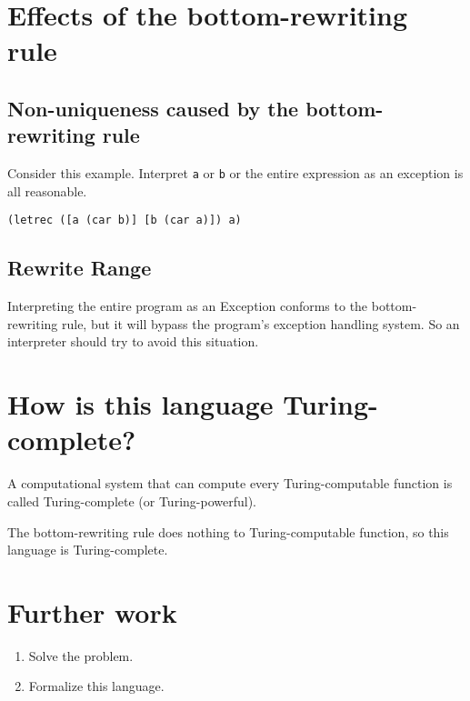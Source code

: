 \documentclass[11pt,preprint,numbers]{sigplanconf}
\begin{document}
\section{Effects of the bottom-rewriting rule}

\subsection{Non-uniqueness caused by the bottom-rewriting rule}

Consider this example. Interpret {\scriptsize\verb|a|} or {\scriptsize\verb|b|} or the entire expression as an exception is all reasonable.
\lstset{language=Lisp}
\begin{lstlisting}[frame=single]
(letrec ([a (car b)] [b (car a)]) a)
\end{lstlisting}

\subsection{Rewrite Range}

Interpreting the entire program as an Exception conforms to the bottom-rewriting rule, but it will bypass the program's exception handling system. So an interpreter should try to avoid this situation.

\section{How is this language Turing-complete?}

A computational system that can compute every Turing-computable function is called Turing-complete (or Turing-powerful).~\citep{wikipedia_Turing_completeness}

The bottom-rewriting rule does nothing to Turing-computable function, so this language is Turing-complete.

\section{Further work}

\begin{enumerate}
\item Solve the problem.
\item Formalize this language.
\end{enumerate}



\end{document}
